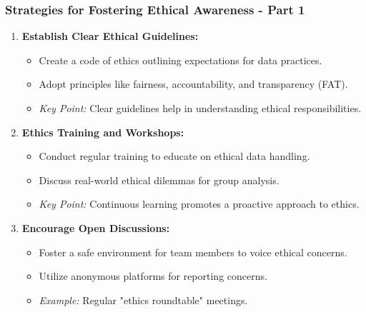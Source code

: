 \documentclass[aspectratio=169]{beamer}
\begin{document}
\begin{frame}[fragile]
    \frametitle{Strategies for Fostering Ethical Awareness - Part 1}
    \begin{enumerate}
        \item \textbf{Establish Clear Ethical Guidelines:}
        \begin{itemize}
            \item Create a code of ethics outlining expectations for data practices.
            \item Adopt principles like fairness, accountability, and transparency (FAT).
            \item \textit{Key Point:} Clear guidelines help in understanding ethical responsibilities.
        \end{itemize}

        \item \textbf{Ethics Training and Workshops:}
        \begin{itemize}
            \item Conduct regular training to educate on ethical data handling.
            \item Discuss real-world ethical dilemmas for group analysis.
            \item \textit{Key Point:} Continuous learning promotes a proactive approach to ethics.
        \end{itemize}

        \item \textbf{Encourage Open Discussions:}
        \begin{itemize}
            \item Foster a safe environment for team members to voice ethical concerns.
            \item Utilize anonymous platforms for reporting concerns.
            \item \textit{Example:} Regular "ethics roundtable" meetings.
        \end{itemize}
    \end{enumerate}
\end{frame}
\end{document}
